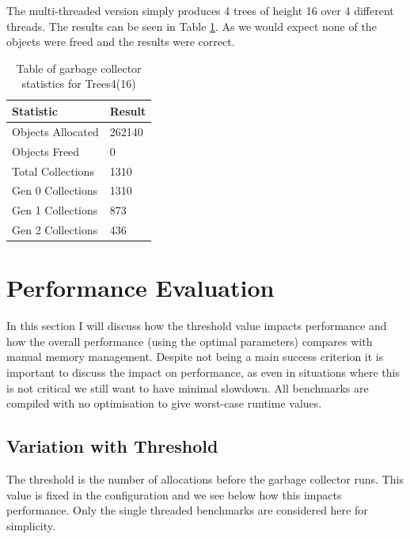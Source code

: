 \documentclass[../diss.tex]{subfiles}
\begin{document}
The multi-threaded version simply produces 4 trees of height 16 over 4 different threads. The results can be seen in Table \ref{tab:treesnstats}. As we would expect none of the objects were freed and the results were correct.

\begin{table}
    \centering
    \begin{tabular}{| l | l |}
        \hline
         \bf{Statistic} & \bf{Result} \\ \hline
         Objects Allocated & 262140 \\ \hline
         Objects Freed & 0 \\ \hline
         Total Collections & 1310 \\ \hline
         Gen 0 Collections & 1310 \\ \hline
         Gen 1 Collections & 873 \\ \hline
         Gen 2 Collections & 436 \\ \hline
    \end{tabular}
    \caption{Table of garbage collector statistics for Trees4(16)}
    \label{tab:treesnstats}
\end{table}


\section{Performance Evaluation}

In this section I will discuss how the threshold value impacts performance and how the overall performance (using the optimal parameters) compares with manual memory management. Despite not being a main success criterion it is important to discuss the impact on performance, as even in situations where this is not critical we still want to have minimal slowdown. All benchmarks are compiled with no optimisation to give worst-case runtime values.

\subsection{Variation with Threshold} \label{sec:variationwiththreshold}

The threshold is the number of allocations before the garbage collector runs. This value is fixed in the configuration and we see below how this impacts performance. Only the single threaded benchmarks are considered here for simplicity. 
\end{document}
